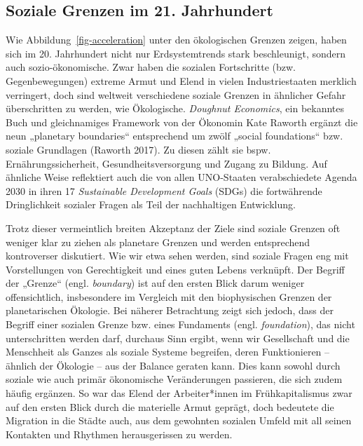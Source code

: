 \documentclass[
  nswissgerman,
  a4paper,
  DIV=11,
  numbers=noendperiod,
  oneside,
  openany]{scrreprt}
\begin{document}
\subsection{Soziale Grenzen im 21.
Jahrhundert}\label{soziale-grenzen-im-21.-jahrhundert}

Wie Abbildung~\ref{fig-acceleration} unter den ökologischen Grenzen
zeigen, haben sich im 20. Jahrhundert nicht nur Erdsystemtrends stark
beschleunigt, sondern auch sozio-ökonomische. Zwar haben die sozialen
Fortschritte (bzw. Gegenbewegungen) extreme Armut und Elend in vielen
Industriestaaten merklich verringert, doch sind weltweit verschiedene
soziale Grenzen in ähnlicher Gefahr überschritten zu werden, wie
Ökologische. \emph{Doughnut Economics}, ein bekanntes Buch und
gleichnamiges Framework von der Ökonomin Kate Raworth ergänzt die neun
„planetary boundaries`` entsprechend um zwölf „social foundations`` bzw.
soziale Grundlagen (Raworth 2017). Zu diesen zählt sie bspw.
Ernährungssicherheit, Gesundheitsversorgung und Zugang zu Bildung. Auf
ähnliche Weise reflektiert auch die von allen UNO-Staaten verabschiedete
Agenda 2030 in ihren 17 \emph{Sustainable Development Goals} (SDGs) die
fortwährende Dringlichkeit sozialer Fragen als Teil der nachhaltigen
Entwicklung.

Trotz dieser vermeintlich breiten Akzeptanz der Ziele sind soziale
Grenzen oft weniger klar zu ziehen als planetare Grenzen und werden
entsprechend kontroverser diskutiert. Wie wir etwa sehen werden, sind
soziale Fragen eng mit Vorstellungen von Gerechtigkeit und eines guten
Lebens verknüpft. Der Begriff der „Grenze`` (engl. \emph{boundary}) ist
auf den ersten Blick darum weniger offensichtlich, insbesondere im
Vergleich mit den biophysischen Grenzen der planetarischen Ökologie. Bei
näherer Betrachtung zeigt sich jedoch, dass der Begriff einer sozialen
Grenze bzw. eines Fundaments (engl. \emph{foundation}), das nicht
unterschritten werden darf, durchaus Sinn ergibt, wenn wir Gesellschaft
und die Menschheit als Ganzes als soziale Systeme begreifen, deren
Funktionieren -- ähnlich der Ökologie -- aus der Balance geraten kann.
Dies kann sowohl durch soziale wie auch primär ökonomische Veränderungen
passieren, die sich zudem häufig ergänzen. So war das Elend der
Arbeiter*innen im Frühkapitalismus zwar auf den ersten Blick durch die
materielle Armut geprägt, doch bedeutete die Migration in die Städte
auch, aus dem gewohnten sozialen Umfeld mit all seinen Kontakten und
Rhythmen herausgerissen zu werden.
\end{document}
